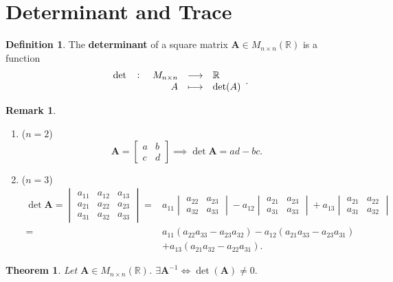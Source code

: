 \documentclass[12pt,openany]{book}
\newtheorem{theorem}{Theorem}[chapter]
\theoremstyle{definition}
\newtheorem{definition}{Definition}[chapter]
\newtheorem{remark}{Remark}[chapter]
\newcommand{\R}{\mathbb{R}}
\newcommand{\by}{\times}
\begin{document}
	\section{Determinant and Trace}
	\begin{tcolorbox}[colframe=defcolor,title={\color{white}\bf Determinant }]
		\begin{definition}
			The \textbf{determinant} of a square matrix \(\textbf{A}\in M_{n\by n}(\R)\) is a function \[
			\fullfunction{\det}{M_{n\by n}}{\R}{A}{\det(A)}.
			\]
		\end{definition}
	\end{tcolorbox}
	\begin{remark}
		 \ \begin{enumerate}[(1)]
			\item ($n=2$) \[
			\textbf{A}=\begin{bmatrix}
				a&b\\c&d
			\end{bmatrix}\implies\det\textbf{A}=ad-bc.
			\]
			\item ($n=3$) \begin{align*}
				\det\textbf{A}=\begin{vmatrix}
					a_{11}&a_{12}&a_{13}\\
					a_{21}&a_{22}&a_{23}\\
					a_{31}&a_{32}&a_{33}
				\end{vmatrix}=&a_{11}\begin{vmatrix}
				a_{22}&a_{23}\\a_{32}&a_{33}
			\end{vmatrix}-a_{12}\begin{vmatrix}
			a_{21}&a_{23}\\a_{31}&a_{33}
		\end{vmatrix}+a_{13}\begin{vmatrix}
		a_{21}&a_{22}\\a_{31}&a_{32}
	\end{vmatrix}\\
			=&a_{11}(a_{22}a_{33}-a_{23}a_{32})
			-a_{12}(a_{21}a_{33}-a_{23}a_{31})\\
			&+a_{13}(a_{21}a_{32}-a_{22}a_{31}).
			\end{align*}
		\end{enumerate}
	\end{remark}
	\vspace{4pt}
	\begin{tcolorbox}[colframe=thmcolor,title={\color{white}\bf }]
		\begin{theorem}
			Let \(\textbf{A}\in M_{n\by n}(\R)\). $
			\exists\textbf{A}^{-1}\iff\det(\textbf{A})\neq 0.
			$	
		\end{theorem}
	\end{tcolorbox}
\end{document}
